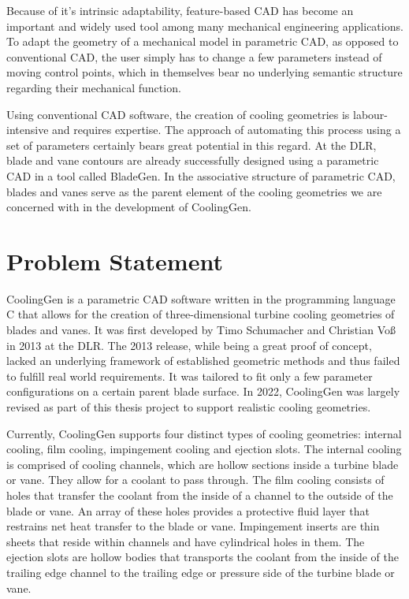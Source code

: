 \documentclass[a4paper, 11pt]{report}
\theoremstyle{definition}
\begin{document}
		Because of it's intrinsic adaptability, feature-based CAD has become an important and widely used tool among many mechanical engineering applications. To adapt the geometry of a mechanical model in parametric CAD, as opposed to conventional CAD, the user simply has to change a few parameters instead of moving control points, which in themselves bear no underlying semantic structure regarding their mechanical function.

		Using conventional CAD software, the creation of cooling geometries is labour-intensive and requires expertise. The approach of automating this process using a set of parameters certainly bears great potential in this regard. At the DLR, blade and vane contours are already successfully designed using a parametric CAD in a tool called BladeGen. In the associative structure of parametric CAD, blades and vanes serve as the parent element of the cooling geometries we are concerned with in the development of CoolingGen.

	\section{Problem Statement}
		CoolingGen is a parametric CAD software written in the programming language C that allows for the creation of three-dimensional turbine cooling geometries of blades and vanes. It was first developed by Timo Schumacher and Christian Voß in 2013 at the DLR. The 2013 release, while being a great proof of concept, lacked an underlying framework of established geometric methods and thus failed to fulfill real world requirements. It was tailored to fit only a few parameter configurations on a certain parent blade surface. In 2022, CoolingGen was largely revised as part of this thesis project to support realistic cooling geometries.

		Currently, CoolingGen supports four distinct types of cooling geometries: internal cooling, film cooling, impingement cooling and ejection slots. The internal cooling is comprised of cooling channels, which are hollow sections inside a turbine blade or vane. They allow for a coolant to pass through. The film cooling consists of holes that transfer the coolant from the inside of a channel to the outside of the blade or vane. An array of these holes provides a protective fluid layer that restrains net heat transfer to the blade or vane. Impingement inserts are thin sheets that reside within channels and have cylindrical holes in them. The ejection slots are hollow bodies that transports the coolant from the inside of the trailing edge channel to the trailing edge or pressure side of the turbine blade or vane.
\end{document}
